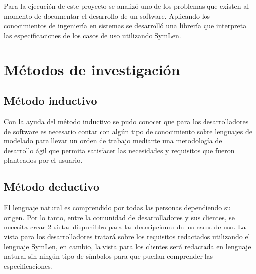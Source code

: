 
Para la ejecución de este proyecto se analizó uno de los problemas que existen al momento de documentar el desarrollo de un software. Aplicando los conocimientos de ingeniería en sistemas se desarrolló una librería que interpreta las especificaciones de los casos de uso utilizando SymLen.


\section{Métodos de investigación}

\subsection{Método inductivo}
% 
Con la ayuda del método inductivo se pudo conocer que para los desarrolladores de software es necesario contar con algún tipo de conocimiento sobre lenguajes de modelado para llevar un orden de trabajo mediante una metodología de desarrollo ágil que permita satisfacer las necesidades y requisitos que fueron planteados por el usuario.

\subsection{Método deductivo}


El lenguaje natural es comprendido por todas las personas dependiendo su origen. Por lo tanto, entre la comunidad de desarrolladores y sus clientes, se necesita crear 2 vistas disponibles para las descripciones de los casos de uso. La vista para los desarrolladores tratará sobre los requisitos redactados utilizando el lenguaje SymLen, en cambio, la vista para los clientes será redactada en lenguaje natural sin ningún tipo de símbolos para que puedan comprender las especificaciones.
 

